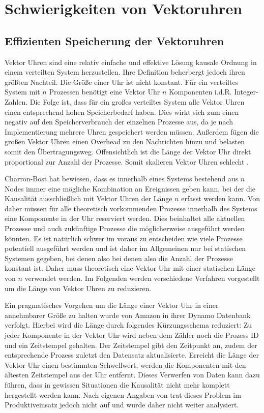 \section{Schwierigkeiten von Vektoruhren}
\subsection{Effizienten Speicherung der Vektoruhren}
Vektor Uhren sind eine relativ einfache und effektive Lösung kausale Ordnung in einem verteilten System herzustellen.
Ihre Definition beherbergt jedoch ihren größten Nachteil.
Die Größe einer Uhr ist nicht konstant.
Für ein verteiltes System mit $n$ Prozessen benötigt eine Vektor Uhr $n$ Komponenten i.d.R. Integer-Zahlen.
Die Folge ist, dass für ein großes verteiltes System alle Vektor Uhren einen entsprechend hohen Speicherbedarf haben.
Dies wirkt sich zum einen negativ auf den Speicherverbrauch der einzelnen Prozesse aus, da je nach Implementierung mehrere Uhren gespeichert werden müssen.
Außerdem fügen die großen Vektor Uhren einen Overhead zu den Nachrichten hinzu und belasten somit den Übertragungsweg.
Offensichtlich ist die Länge der Vektor Uhr direkt proportional zur Anzahl der Prozesse.
Somit skalieren Vektor Uhren schlecht \cite{torres1999plausible}.

Charron-Bost \cite{charron1990concerning} hat bewiesen, dass es innerhalb eines Systems bestehend aus $n$ Nodes immer eine mögliche Kombination an Ereignissen geben kann, bei der die Kausalität ausschließlich mit Vektor Uhren der Länge $n$ erfasst werden kann.
Von daher müssen für alle theoretisch vorkommenden Prozesse innerhalb des Systems eine Komponente in der Uhr reserviert werden.
Dies beinhaltet alle aktuellen Prozesse und auch zukünftige Prozesse die möglicherweise ausgeführt werden könnten.
Es ist natürlich schwer im voraus zu entscheiden wie viele Prozesse potentiell ausgeführt werden und ist daher im Allgemeinen nur bei statischen Systemen gegeben, bei denen also  bei denen also die Anzahl der Prozesse konstant ist.
Daher muss theoretisch eine Vektor Uhr mit einer statischen Länge von $n$ verwendet werden.
Im Folgenden werden verschiedene Verfahren vorgestellt um die Länge von Vektor Uhren zu reduzieren.

Ein pragmatisches Vorgehen um die Länge einer Vektor Uhr in einer annehmbarer Größe zu halten wurde von Amazon in ihrer Dynamo Datenbank \cite{decandia2007dynamo} verfolgt.
Hierbei wird die Länge durch folgendes Kürzungsschema reduziert:
Zu jeder Komponente in der Vektor Uhr wird neben dem Zähler noch die Prozess ID und ein Zeitstempel gehalten.
Der Zeitstempel gibt den Zeitpunkt an, zudem der entsprechende Prozess zuletzt den Datensatz aktualisierte.
Erreicht die Länge der Vektor Uhr einen bestimmten Schwellwert, werden die Komponenten mit den ältesten Zeitstempel aus der Uhr entfernt.
Dieses Verwerfen von Daten kann dazu führen, dass in gewissen Situationen die Kausalität nicht mehr komplett hergestellt werden kann.
Nach eigenen Angaben von  \cite{decandia2007dynamo} trat dieses Problem im Produktiveinsatz jedoch nicht auf und wurde daher nicht weiter analysiert.

